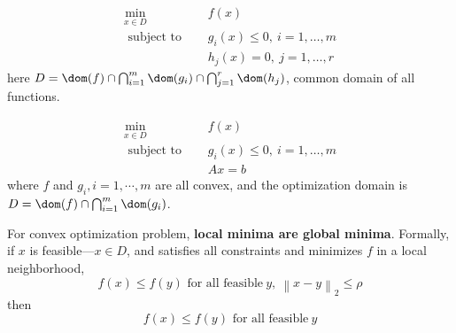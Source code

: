 \documentclass[a4paper]{article}
\begin{document}
{\begin{defi} 
    \begin{align*}
        \min _{x \in D} & \quad f(x) \\
        \text { subject to } &\quad g_{i}(x) \leq 0, \ i=1, \ldots, m \\
        &\quad h_{j}(x)=0, \ j=1, \ldots, r
    \end{align*}
  here $D = \dom (f) \cap \bigcap_{i=1}^{m} \dom (g_{i}) \cap \bigcap_{j=1}^{r} \dom(h_j)$, common domain of all functions.
\end{defi}

\begin{defi} 
  \begin{align*}
      \min _{x \in D} & \quad f(x)  \\
      \text { subject to } &\quad g_{i}(x)\leq 0, \ i=1, \ldots, m \\
      & \quad  Ax = b 
  \end{align*}
  where $f$ and $g_i, i= 1,\cdots,m $ are all convex, and the optimization domain is $D = \dom (f) \cap \bigcap_{i=1}^{m} \dom (g_{i})$.
\end{defi}


\noindent For convex optimization problem, \textbf{local minima are global minima}.
Formally, if $x$ is feasible---$x \in D$, and satisfies all constraints and minimizes $f$ in a local neighborhood,
\[
    f(x) \leq f(y) \text{\ for \ all \ feasible} \ y, \ \left\lVert x -y \right\rVert_2 \leq \rho
\]
then
\[
    f(x) \leq f(y) \text{\ for \ all \ feasible} \ y
\]


}
\end{document}
